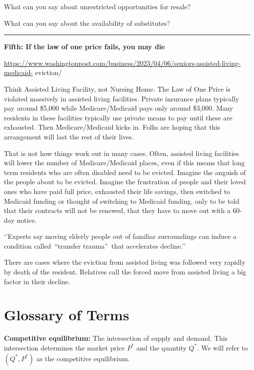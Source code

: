 \documentclass[
]{book}
\begin{document}
What can you say about unrestricted opportunities for resale?

What can you say about the availability of substitutes?

\begin{center}\rule{0.5\linewidth}{0.5pt}\end{center}

\textbf{Fifth: If the law of one price fails, you may die}

\url{https://www.washingtonpost.com/business/2023/04/06/seniors-assisted-living-medicaid-}
eviction/

Think Assisted Living Facility, not Nursing Home. The Law of One Price is violated massively in assisted living facilities. Private insurance plans typically pay around \$5,000 while Medicare/Medicaid pays only around \$3,000. Many residents in these facilities typically use private means to pay until these are exhausted. Then Medicare/Medicaid kicks in. Folks are
hoping that this arrangement will last the rest of their lives.

That is not how things work out in many cases. Often, assisted living facilities will lower the number of Medicare/Medicaid places, even if this means that long term residents who are often disabled need to be evicted. Imagine the anguish of the people about to be evicted. Imagine the frustration of people and their loved ones who have paid full price, exhausted their
life savings, then switched to Medicaid funding or thought of switching to Medicaid funding,
only to be told that their contracts will not be renewed, that they have to move out with a 60-
day notice.

`'Experts say moving elderly people out of familiar surroundings can induce a condition called~``transfer trauma''~that accelerates decline.''

There are cases where the eviction from assisted living was followed very rapidly by death of the resident. Relatives call the forced move from assisted living a big factor in their decline.

\hypertarget{glossary-of-terms-6}{%
\section{Glossary of Terms}\label{glossary-of-terms-6}}

\textbf{Competitive equilibrium:} The intersection of supply and demand. This intersection determines the market price \(P^*\) and the quantity \(Q^*\). We will refer to \((Q^*, P^*)\) as the competitive equilibrium.
\end{document}
